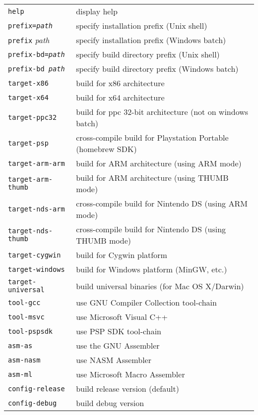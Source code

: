 \begin{enumerate}
\begin{tabular}{ll}	
{\tt help}                 & display help \\
{\tt prefix={\it path}}    & specify installation prefix (Unix shell) \\
{\tt prefix} {\it path}    & specify installation prefix (Windows batch) \\
{\tt prefix-bd={\it path}} & specify build directory prefix (Unix shell) \\
{\tt prefix-bd {\it path}} & specify build directory prefix (Windows batch) \\
{\tt target-x86}           & build for x86 architecture \\
{\tt target-x64}           & build for x64 architecture \\
{\tt target-ppc32}         & build for ppc 32-bit architecture (not on windows batch)\\
{\tt target-psp}           & cross-compile build for Playstation Portable (homebrew SDK)\\
{\tt target-arm-arm}       & build for ARM architecture (using ARM mode) \\
{\tt target-arm-thumb}     & build for ARM architecture (using THUMB mode) \\
{\tt target-nds-arm}       & cross-compile build for Nintendo DS (using ARM mode) \\
{\tt target-nds-thumb}     & cross-compile build for Nintendo DS (using THUMB mode) \\
{\tt target-cygwin}        & build for Cygwin platform \\
{\tt target-windows}       & build for Windows platform (MinGW, etc.) \\
{\tt target-universal}     & build universal binaries (for Mac OS X/Darwin) \\
{\tt tool-gcc}             & use GNU Compiler Collection tool-chain \\
{\tt tool-msvc}            & use Microsoft Visual C++ \\
{\tt tool-pspsdk}          & use PSP SDK tool-chain \\
{\tt asm-as}               & use the GNU Assembler \\
{\tt asm-nasm}             & use NASM Assembler \\
{\tt asm-ml}               & use Microsoft Macro Assembler \\
{\tt config-release}       & build release version (default) \\
{\tt config-debug}         & build debug version \\
\end{tabular}


\end{enumerate}
